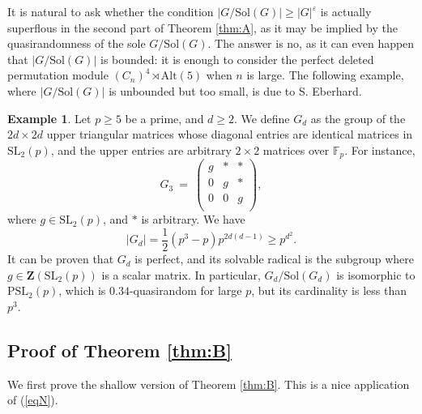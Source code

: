 \documentclass{daj}
\theoremstyle{definition}
\newtheorem{example}[theorem]{Example}
\theoremstyle{remark}
\newcommand{\Alt}{\mathrm{Alt}}
\newcommand{\Sol}{\mathrm{Sol}}
\newcommand{\PSL}{\mathrm{PSL}}
\newcommand{\SL}{\mathrm{SL}}
\newcommand{\Z}{\mathbf{Z}}
\begin{document}
It is natural to ask whether the condition $|G/\Sol(G)| \geq |G|^\varepsilon$ is actually superflous in the second part of Theorem \ref{thm:A},
as it may be implied by the quasirandomness of the sole $G/\Sol(G)$.
The answer is no, as it can even happen that $|G/\Sol(G)|$ is bounded:
it is enough to consider the perfect deleted permutation module $(C_n)^4 \rtimes \Alt(5)$ when $n$ is large.
The following example, where $|G/\Sol(G)|$ is unbounded but too small, is due to S. Eberhard.

\begin{example}
	Let $p \geq 5$ be a prime, and $d \geq 2$.
	We define $G_d$ as the group of the $2d \times 2d$ upper triangular matrices whose diagonal entries
	are identical matrices in $\SL_2(p)$, and the upper entries are arbitrary $2 \times 2$ matrices over $\mathbb{F}_p$.
	For instance,
	$$
	G_3 \> = \>
	\left(
	\begin{array}{ccc}
		g & * & *  \\
		0 & g & *  \\
		0 & 0 & g  \\
	\end{array}
	\right) ,
	$$
	where $g \in \SL_2(p)$, and $*$ is arbitrary.
	We have
	$$ |G_d| = \frac{1}{2}(p^3-p) p^{2d(d-1)} \geq p^{d^2} . $$
	It can be proven that $G_d$ is perfect, and its solvable radical is the subgroup where $g \in \Z(\SL_2(p))$ is a scalar matrix.
	In particular, $G_d/\Sol(G_d)$ is isomorphic to $\PSL_2(p)$, which is $0.34$-quasirandom for large $p$, but its cardinality is less than $p^3$.
\end{example}


















\subsection{Proof of Theorem \ref{thm:B}} 

We first prove the shallow version of Theorem \ref{thm:B}.
This is a nice application of (\ref{eqN}).
\end{document}
